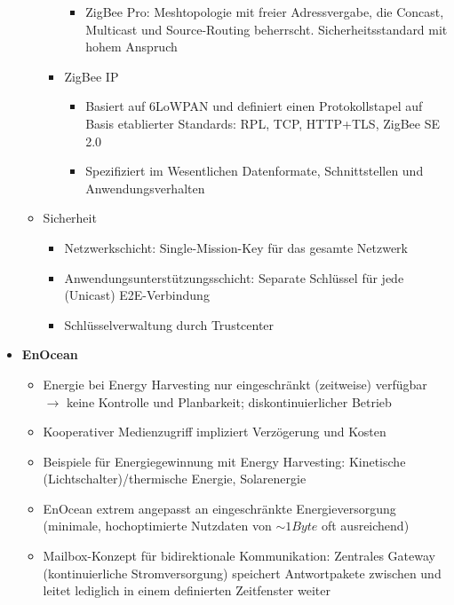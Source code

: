 \begin{itemize}
\begin{itemize}
\begin{itemize}
\begin{itemize}
				\item ZigBee Pro: Meshtopologie mit freier Adressvergabe, die Concast, Multicast und Source-Routing beherrscht. Sicherheitsstandard mit hohem Anspruch
			\end{itemize}
			\item ZigBee IP
			\begin{itemize}
				\item Basiert auf 6LoWPAN und definiert einen Protokollstapel auf Basis etablierter Standards: RPL, TCP, HTTP+TLS, ZigBee SE 2.0
				\item Spezifiziert im Wesentlichen Datenformate, Schnittstellen und Anwendungsverhalten
			\end{itemize}
		\end{itemize}
		\item Sicherheit
		\begin{itemize}
			\item Netzwerkschicht: Single-Mission-Key für das gesamte Netzwerk
			\item Anwendungsunterstützungsschicht: Separate Schlüssel für jede (Unicast) E2E-Verbindung
			\item Schlüsselverwaltung durch Trustcenter
		\end{itemize}
	\end{itemize}
	\item \textbf{EnOcean}
	\begin{itemize}
		\item Energie bei Energy Harvesting nur eingeschränkt (zeitweise) verfügbar \(\rightarrow\) keine Kontrolle und Planbarkeit; diskontinuierlicher Betrieb
		\item Kooperativer Medienzugriff impliziert Verzögerung und Kosten
		\item Beispiele für Energiegewinnung mit Energy Harvesting: Kinetische (Lichtschalter)/thermische Energie, Solarenergie
		\item EnOcean extrem angepasst an eingeschränkte Energieversorgung (minimale, hochoptimierte Nutzdaten von \(\sim 1 Byte\) oft ausreichend)
		\item Mailbox-Konzept für bidirektionale Kommunikation: Zentrales Gateway (kontinuierliche Stromversorgung) speichert Antwortpakete zwischen und leitet lediglich in einem definierten Zeitfenster weiter
	\end{itemize}
\end{itemize}


